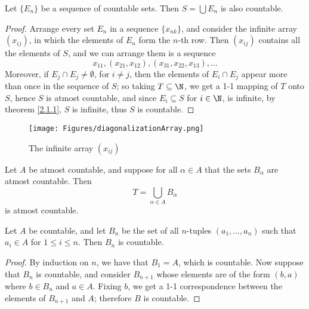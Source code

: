 \begin{theorem}\label{2.1.2}
    Let $\{E_n\}$ be a sequence of countable sets. Then  $S=\bigcup{E_n}$ is also countable.
\end{theorem}
\begin{proof}
    Arrange every set $E_n$ in a sequence  $\{x_{nk}\}$, and consider the infinite array
    $(x_{ij})$, in which the elements of  $E_n$ form the  $n$-th row. Then  $(x_{ij})$ contains
    all the elements of  $S$, and we can arrange them is a sequence
        \begin{equation*}
            x_{11}, (x_{21},x_{12}), (x_{31},x_{22},x_{13}), \dots
        \end{equation*}
    Moreover, if $E_j \cap E_j \neq \emptyset$, for  $i \neq j$, then the elements of  $E_i \cap E_j$
    appear more than once in the sequence of  $S$; so taking  $T \subseteq \N$, we get
    a 1-1 mapping of  $T$ onto  $S$, hence  $S$ is atmost countable, and since $E_i \subseteq S$
    for  $i \in \N$, is infinite, by theorem \ref{2.1.1},  $S$ is infinite, thus  $S$ is
    countable.
\end{proof}

\begin{figure}
    \centering
    \texttt{[image: Figures/diagonalizationArray.png]}
    \caption{The infinite array $(x_{ij})$}
    \label{fig_2.1}
\end{figure}

\begin{corollary}
    Let $A$ be atmost countable, and suppose for all  $\alpha \in A$ that the sets
    $B_{\alpha}$ are atmost countable. Then
        \begin{equation*}
            T=\bigcup_{\alpha \in A}{B_{\alpha}}
        \end{equation*}
    is atmost countable.
\end{corollary}

\begin{theorem}\label{2.1.3}
    Let $A$ be countable, and let  $B_n$ be the set of all  $n$-tuples  $(a_1, \dots, a_n)$
    such that $a_i \in A$ for  $1 \leq i \leq n$. Then  $B_n$ is countable.
\end{theorem}
\begin{proof}
    By induction on $n$, we have that  $B_1=A$, which is countable. Now suppose that
    $B_n$ is countable, and consider  $B_{n+1}$ whose elements are of the form  $(b,a)$
    where  $b \in B_n$ and  $a \in A$. Fixing  $b$, we get a 1-1 correspondence between the
    elements of  $B_{n+1}$ and  $A$; therefore  $B$ is countable.
\end{proof}

